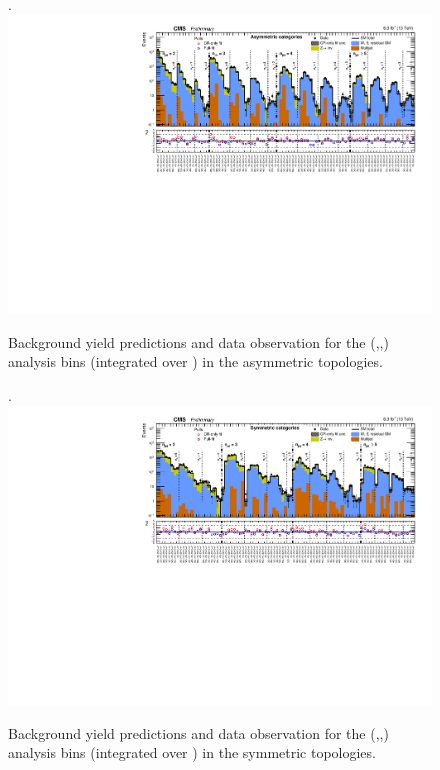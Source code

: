 \clearpage
\begin{landscape}
  \begin{center}
    \begin{figure}[h!]
      \caption{Background yield predictions and data observation for the (\njet,\nb,\scalht) analysis bins (integrated over \MHT) in the asymmetric topologies. \label{fig:summaryPlot_Asymmetric}}.
      \includegraphics[width=0.9\linewidth]{figures/postFitResults/summaryPlots/summaryPlot_Asymmetric_prefit_overlay_fit_b}
    \end{figure}
  \end{center}
\end{landscape}

\clearpage
\begin{landscape}
  \begin{center}
    \begin{figure}[h!]
      \caption{Background yield predictions and data observation for the (\njet,\nb,\scalht) analysis bins (integrated over \MHT) in the symmetric topologies. \label{fig:summaryPlot_Symmetric}}.
      \includegraphics[width=0.9\linewidth]{figures/postFitResults/summaryPlots/summaryPlot_Symmetric_prefit_overlay_fit_b}
    \end{figure}
  \end{center}
\end{landscape}


